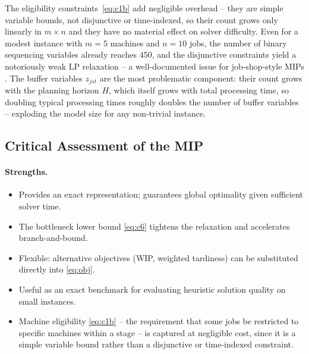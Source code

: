 \documentclass[11pt,a4paper]{article}
\begin{document}
The eligibility constraints~\eqref{eq:c1b} add negligible overhead --
they are simple variable bounds, not disjunctive or time-indexed, so
their count grows only linearly in $m \times n$ and they have no
material effect on solver difficulty. Even for a modest instance with
$m=5$ machines and $n=10$ jobs, the number
of binary sequencing variables already reaches $450$, and the disjunctive
constraints yield a notoriously weak LP relaxation -- a well-documented
issue for job-shop-style MIPs \citep{pinedo2016scheduling}. The buffer
variables $z_{jst}$ are the most problematic component: their count
grows with the planning horizon $H$, which itself grows with total
processing time, so doubling typical processing times roughly doubles
the number of buffer variables -- exploding the model size for any
non-trivial instance.

\subsection{Critical Assessment of the MIP}

\paragraph{Strengths.}
\begin{itemize}
  \item Provides an exact representation; guarantees global optimality
    given sufficient solver time.
  \item The bottleneck lower bound \eqref{eq:c6} tightens the relaxation
    and accelerates branch-and-bound.
  \item Flexible: alternative objectives (WIP, weighted tardiness) can be
    substituted directly into \eqref{eq:obj}.
  \item Useful as an exact benchmark for evaluating heuristic solution
    quality on small instances.
  \item Machine eligibility \eqref{eq:c1b} -- the requirement that some
    jobs be restricted to specific machines within a stage -- is captured
    at negligible cost, since it is a simple variable bound rather than a
    disjunctive or time-indexed constraint.
\end{itemize}
\end{document}
